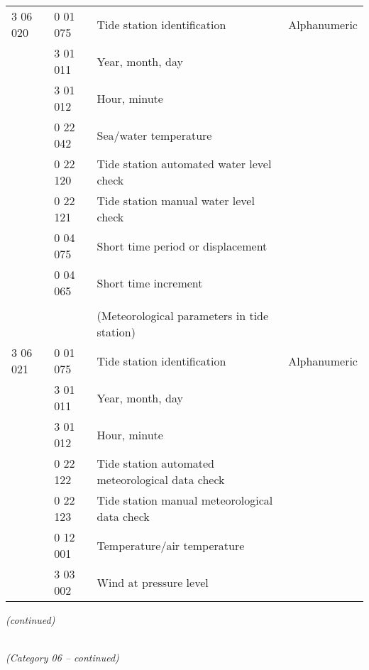 \begin{longtable}[]{@{}llll@{}}
3 06 020 & 0 01 075 & Tide station identification & Alphanumeric\tabularnewline
& 3 01 011 & Year, month, day &\tabularnewline
& 3 01 012 & Hour, minute &\tabularnewline
& 0 22 042 & Sea/water temperature &\tabularnewline
& 0 22 120 & Tide station automated water level check &\tabularnewline
& 0 22 121 & Tide station manual water level check &\tabularnewline
& 0 04 075 & Short time period or displacement &\tabularnewline
& 0 04 065 & Short time increment &\tabularnewline
& & &\tabularnewline
& & (Meteorological parameters in tide station) &\tabularnewline
3 06 021 & 0 01 075 & Tide station identification & Alphanumeric\tabularnewline
& 3 01 011 & Year, month, day &\tabularnewline
& 3 01 012 & Hour, minute &\tabularnewline
& 0 22 122 & Tide station automated meteorological data check &\tabularnewline
& 0 22 123 & Tide station manual meteorological data check &\tabularnewline
& 0 12 001 & Temperature/air temperature &\tabularnewline
& 3 03 002 & Wind at pressure level &\tabularnewline
\bottomrule
\end{longtable}

\emph{(continued)}

\emph{\\
(Category 06 -- continued)}

